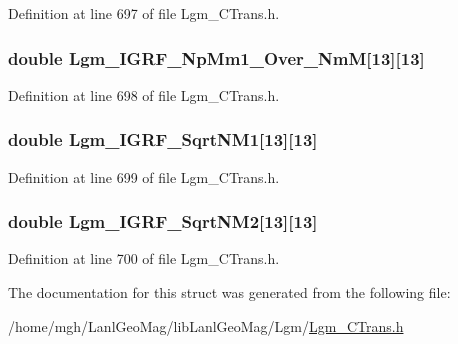 Definition at line 697 of file Lgm\_\-CTrans.h.\hypertarget{struct_lgm___c_trans_96a1803f9964fff5d9095953e098437f}{
\subsubsection[{Lgm\_\-IGRF\_\-NpMm1\_\-Over\_\-NmM}]{\setlength{\rightskip}{0pt plus 5cm}double {\bf Lgm\_\-IGRF\_\-NpMm1\_\-Over\_\-NmM}\mbox{[}13\mbox{]}\mbox{[}13\mbox{]}}}
\label{struct_lgm___c_trans_96a1803f9964fff5d9095953e098437f}




Definition at line 698 of file Lgm\_\-CTrans.h.\hypertarget{struct_lgm___c_trans_447bb9f7fa254244901964f96c0ccf2f}{
\subsubsection[{Lgm\_\-IGRF\_\-SqrtNM1}]{\setlength{\rightskip}{0pt plus 5cm}double {\bf Lgm\_\-IGRF\_\-SqrtNM1}\mbox{[}13\mbox{]}\mbox{[}13\mbox{]}}}
\label{struct_lgm___c_trans_447bb9f7fa254244901964f96c0ccf2f}




Definition at line 699 of file Lgm\_\-CTrans.h.\hypertarget{struct_lgm___c_trans_fbdaf18ce038d57df3465a30a2a72b11}{
\subsubsection[{Lgm\_\-IGRF\_\-SqrtNM2}]{\setlength{\rightskip}{0pt plus 5cm}double {\bf Lgm\_\-IGRF\_\-SqrtNM2}\mbox{[}13\mbox{]}\mbox{[}13\mbox{]}}}
\label{struct_lgm___c_trans_fbdaf18ce038d57df3465a30a2a72b11}




Definition at line 700 of file Lgm\_\-CTrans.h.

The documentation for this struct was generated from the following file:\begin{CompactItemize}
\item 
/home/mgh/LanlGeoMag/libLanlGeoMag/Lgm/\hyperlink{_lgm___c_trans_8h}{Lgm\_\-CTrans.h}\end{CompactItemize}
